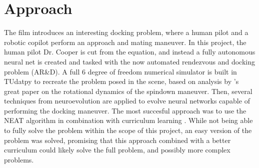 \section{Approach}
The film introduces an interesting docking problem, where a human pilot and a robotic copilot perform an approach and mating maneuver. In this project, the human pilot Dr. Cooper is cut from the equation, and instead a fully autonomous neural net is created and tasked with the now automated rendezvous and docking problem (AR\&D). A full 6 degree of freedom numerical simulator is built in TUdatpy to recreate the problem posed in the scene, based on analysis by \cite{Girija2016} 's great paper on the rotational dynamics of the spindown maneuver. Then, several techniques from neuroevolution are applied to evolve neural networks capable of performing the docking maneuver. The most succesful approach was to use the NEAT algorithm \parencite{stanley2002evolving} in combination with curriculum learning \parencite{bengio2009curriculum}. While not being able to fully solve the problem within the scope of this project, an easy version of the problem was solved, promising that this approach combined with a better curriculum could likely solve the full problem, and possibly more complex problems.

